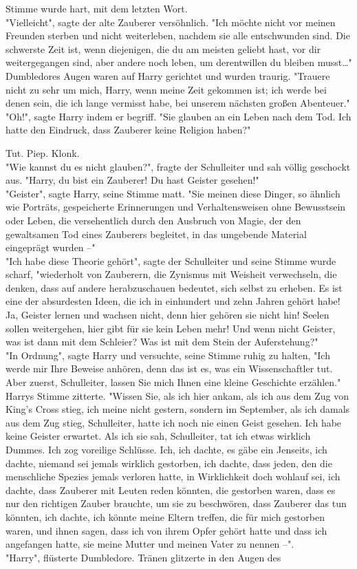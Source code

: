 {Stimme wurde hart, mit dem letzten Wort.\\ "Vielleicht", sagte der alte Zauberer versöhnlich. "Ich möchte nicht vor meinen Freunden sterben und nicht weiterleben, nachdem sie alle entschwunden sind. Die schwerste Zeit ist, wenn diejenigen, die du am meisten geliebt hast, vor dir weitergegangen sind, aber andere noch leben, um derentwillen du bleiben musst…" Dumbledores Augen waren auf Harry gerichtet und wurden traurig. "Trauere nicht zu sehr um mich, Harry, wenn meine Zeit gekommen ist; ich werde bei denen sein, die ich lange vermisst habe, bei unserem nächsten großen Abenteuer."\\ "Oh!", sagte Harry indem er begriff. "Sie glauben an ein Leben nach dem Tod. Ich hatte den Eindruck, dass Zauberer keine Religion haben?"

Tut. Piep. Klonk.\\ "Wie kannst du es nicht glauben?", fragte der Schulleiter und sah völlig geschockt aus. "Harry, du bist ein Zauberer! Du hast Geister gesehen!"\\ "Geister", sagte Harry, seine Stimme matt. "Sie meinen diese Dinger, so ähnlich wie Porträts, gespeicherte Erinnerungen und Verhaltensweisen ohne Bewusstsein oder Leben, die versehentlich durch den Ausbruch von Magie, der den gewaltsamen Tod eines Zauberers begleitet, in das umgebende Material eingeprägt wurden --"\\ "Ich habe diese Theorie gehört", sagte der Schulleiter und seine Stimme wurde scharf, "wiederholt von Zauberern, die Zynismus mit Weisheit verwechseln, die denken, dass auf andere herabzuschauen bedeutet, sich selbst zu erheben. Es ist eine der absurdesten Ideen, die ich in einhundert und zehn Jahren gehört habe! Ja, Geister lernen und wachsen nicht, denn hier gehören sie nicht hin! Seelen sollen weitergehen, hier gibt für sie kein Leben mehr! Und wenn nicht Geister, was ist dann mit dem Schleier? Was ist mit dem Stein der Auferstehung?"\\ "In Ordnung", sagte Harry und versuchte, seine Stimme ruhig zu halten, "Ich werde mir Ihre Beweise anhören, denn das ist es, was ein Wissenschaftler tut. Aber zuerst, Schulleiter, lassen Sie mich Ihnen eine kleine Geschichte erzählen." Harrys Stimme zitterte. "Wissen Sie, als ich hier ankam, als ich aus dem Zug von King's Cross stieg, ich meine nicht gestern, sondern im September, als ich damals aus dem Zug stieg, Schulleiter, hatte ich noch nie einen Geist gesehen. Ich habe keine Geister erwartet. Als ich sie sah, Schulleiter, tat ich etwas wirklich Dummes. Ich zog voreilige Schlüsse. Ich, ich dachte, es gäbe ein Jenseits, ich dachte, niemand sei jemals wirklich gestorben, ich dachte, dass jeden, den die menschliche Spezies jemals verloren hatte, in Wirklichkeit doch wohlauf sei, ich dachte, dass Zauberer mit Leuten reden könnten, die gestorben waren, dass es nur den richtigen Zauber brauchte, um sie zu beschwören, dass Zauberer das tun könnten, ich dachte, ich könnte meine Eltern treffen, die für mich gestorben waren, und ihnen sagen, dass ich von ihrem Opfer gehört hatte und dass ich angefangen hatte, sie meine Mutter und meinen Vater zu nennen --".\\ "Harry", flüsterte Dumbledore. Tränen glitzerte in den Augen des }
